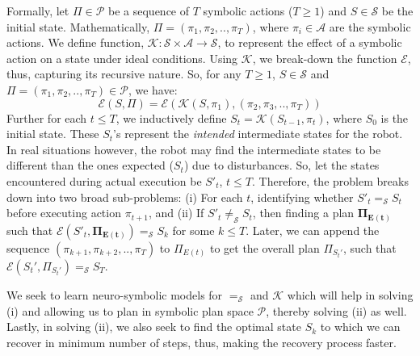 Formally, let $\Pi \in \mathcal{P}$ be a sequence of $T$ symbolic actions ($T \geq 1$) and $S \in \mathcal{S}$ be the initial state. Mathematically, $\Pi = (\pi_1, \pi_2, .., \pi_T)$, where $\pi_i \in \mathcal{A}$ are the symbolic actions. We define function, $\mathcal{K}: \mathcal{S} \times \mathcal{A} \rightarrow \mathcal{S}$, to represent the effect of a symbolic action on a state under ideal conditions. Using $\mathcal{K}$, we break-down the function $\mathcal{E}$, thus, capturing its recursive nature. So, for any $T \geq 1$, $S \in \mathcal{S}$ and $\Pi = (\pi_1, \pi_2, .., \pi_T) \in \mathcal{P}$, we have:
\begin{equation}
    \mathcal{E}(S, \Pi) = \mathcal{E}(\mathcal{K}(S, \pi_1), (\pi_2, \pi_3, .., \pi_T))
\end{equation}
Further for each $t \leq T$, we inductively define $S_t = \mathcal{K}(S_{t - 1}, \pi_t)$, where $S_0$ is the initial state. These $S_t$'s represent the \textit{intended} intermediate states for the robot.
In real situations however, the robot may find the intermediate states to be different than the ones expected ($S_t$) due to disturbances. So, let the states encountered during actual execution be $S'_t$, $t \leq T$. Therefore, the problem breaks down into two broad sub-problems: (i) For each $t$, identifying whether $S'_t =_\mathcal{S} S_t$ before executing action $\pi_{t + 1}$, and (ii) If $S'_t \neq_\mathcal{S} S_t$, then finding a plan $\mathbf{\Pi_{E(t)}}$ such that $\mathcal{E}(S'_t, \mathbf{\Pi_{E(t)}}) =_\mathcal{S} S_k$ for some $k \leq T$. Later, we can append the sequence $(\pi_{k + 1}, \pi_{k + 2}, .., \pi_T)$ to $\Pi_{E(t)}$ to get the overall plan $\Pi_{S_t'}$, such that $\mathcal{E}(S_t', \Pi_{S_t'}) =_\mathcal{S} S_T$. 

We seek to learn neuro-symbolic models for $=_\mathcal{S}$ and $\mathcal{K}$ which will help in solving (i) and allowing us to plan in symbolic plan space $\mathcal{P}$, thereby solving (ii) as well. Lastly, in solving (ii), we also seek to find the optimal state $S_k$ to which we can recover in minimum number of steps, thus, making the recovery process faster.